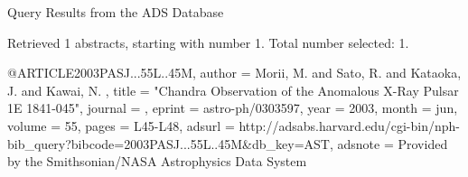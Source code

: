 Query Results from the ADS Database


Retrieved 1 abstracts, starting with number 1.  Total number selected: 1.

@ARTICLE{2003PASJ...55L..45M,
   author = {{Morii}, M. and {Sato}, R. and {Kataoka}, J. and {Kawai}, N.
	},
    title = "{Chandra Observation of the Anomalous X-Ray Pulsar 1E 1841-045}",
  journal = {\pasj},
   eprint = {astro-ph/0303597},
     year = 2003,
    month = jun,
   volume = 55,
    pages = {L45-L48},
   adsurl = {http://adsabs.harvard.edu/cgi-bin/nph-bib_query?bibcode=2003PASJ...55L..45M&db_key=AST},
  adsnote = {Provided by the Smithsonian/NASA Astrophysics Data System}
}


